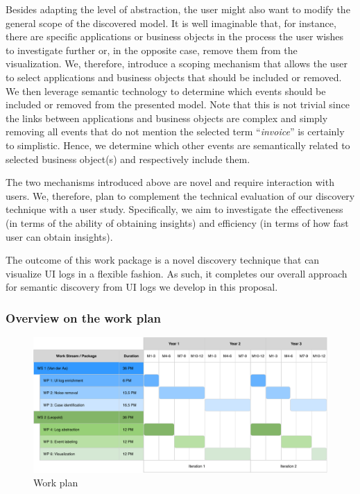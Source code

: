  Besides adapting the level of abstraction, the user might also want to modify the general scope of the discovered model. It is well imaginable that, for instance, there are specific applications or business objects in the process the user wishes to investigate further or, in the opposite case, remove them from the visualization. We, therefore, introduce a scoping  mechanism that allows the user to select applications and business objects that should be included or removed. We then leverage semantic technology to determine which events should be included or removed from the presented model. Note that this is not trivial since the links between applications and business objects are complex and simply removing all events that do not mention the selected term ``\textit{invoice}'' is certainly to simplistic. Hence, we determine which other events are semantically related to selected business object(s) and respectively include them.    

 The two mechanisms introduced above are novel and require interaction with users. We, therefore, plan to complement the technical evaluation of our discovery technique with a user study. Specifically, we aim to investigate the effectiveness (in terms of the ability of obtaining insights) and efficiency (in terms of how fast user can obtain insights).      

 The outcome of this work package is a novel discovery technique that can visualize UI logs in a flexible fashion. As such, it completes our overall approach for semantic discovery from UI logs we develop in this proposal. 



\subsubsection{Overview on the work plan}

\begin{figure}[bt]
	\includegraphics[width=\textwidth]{Figures/Gantt.pdf}
	\caption{Work plan}
	\label{fig:workplan}
\end{figure}

